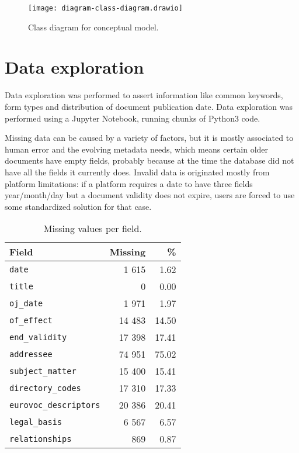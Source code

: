 \documentclass[sigconf, authorversion]{acmart}
\begin{document}
\begin{figure}
  \texttt{[image: diagram-class-diagram.drawio]}
  \caption{Class diagram for conceptual model.}
  \label{fig:class-diagram}
\end{figure}

\section{Data exploration}
\label{sec:data-exploration}

Data exploration was performed to assert information like common keywords, form types and distribution of document publication date. Data exploration was performed using a Jupyter Notebook, running chunks of Python3 code.

Missing data can be caused by a variety of factors, but it is mostly associated to human error and the evolving metadata needs, which means certain older documents have empty fields, probably because at the time the database did not have all the fields it currently does. Invalid data is originated mostly from platform limitations: if a platform requires a date to have three fields year/month/day but a document validity does not expire, users are forced to use some standardized solution for that case.

\begin{table}[ht]
    \centering
    \caption{Missing values per field.} \label{tab:missing}
    \begin{tabular}{@{}l|r|r@{}}
        \textbf{Field}              & \textbf{Missing}& \textbf{\%} \\ \hline
        \texttt{date}                   & 1 615            & 1.62                    \\
        \texttt{title}                  & 0               & 0.00                    \\
        \texttt{oj\_date}               & 1 971            & 1.97                    \\
        \texttt{of\_effect}             & 14 483           & 14.50                   \\
        \texttt{end\_validity}          & 17 398           & 17.41                   \\
        \texttt{addressee}              & 74 951           & 75.02                   \\
        \texttt{subject\_matter}        & 15 400           & 15.41                   \\
        \texttt{directory\_codes}       & 17 310           & 17.33                   \\
        \texttt{eurovoc\_descriptors}   & 20 386           & 20.41                   \\
        \texttt{legal\_basis}           & 6 567            & 6.57                    \\
        \texttt{relationships}          & 869             & 0.87                    \\
    \end{tabular}
\end{table}
\end{document}
